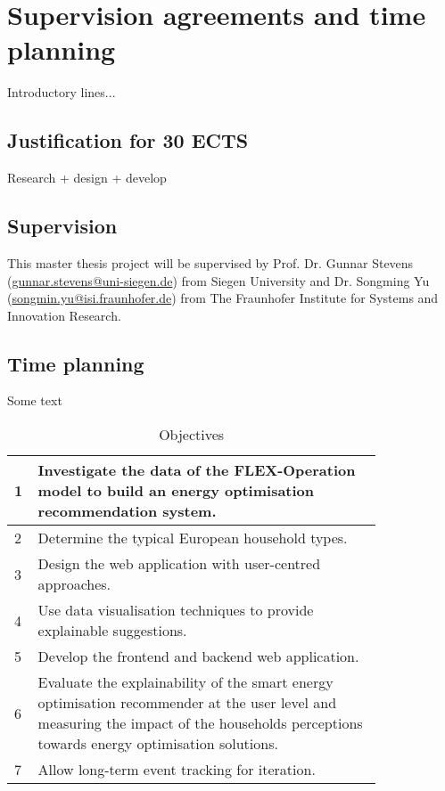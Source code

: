 \chapter{Supervision agreements and time planning} 

Introductory lines...

\section{Justification for 30 ECTS}

Research + design + develop

\section{Supervision}

This master thesis project will be supervised by 
Prof. Dr. Gunnar Stevens (\href{mailto:gunnar.stevens@uni-siegen.de}{gunnar.stevens@uni-siegen.de}) from Siegen University and 
Dr. Songming Yu (\href{mailto:songmin.yu@isi.fraunhofer.de}{songmin.yu@isi.fraunhofer.de}) from The Fraunhofer Institute for Systems and Innovation Research. 

\section{Time planning}

Some text \\

\begin{table}[h]
    \begin{center}
        \begin{tabular}{ p{0.02\linewidth} p{0.8\linewidth} }
        \hline 
        \cellcolor{yellow!70!lime}1 & Investigate the data of the FLEX-Operation model to build an energy optimisation recommendation system. \\
        \hline 
        \cellcolor{yellow!60!lime}2 & Determine the typical European household types. \\
        \hline 
        \cellcolor{yellow!50!lime}3 & Design the web application with user-centred approaches. \\
        \hline 
        \cellcolor{yellow!40!lime}4 & Use data visualisation techniques to provide explainable suggestions. \\
        \hline 
        \cellcolor{yellow!30!lime}5 & Develop the frontend and backend web application. \\
        \hline 
        \cellcolor{yellow!20!lime}6 & Evaluate the explainability of the smart energy optimisation recommender at the user level and measuring the impact of the households perceptions towards energy optimisation solutions. \\
        \hline
        \cellcolor{yellow!10!lime}7 & Allow long-term event tracking for iteration. \\
        \hline 
        \end{tabular}
        \caption{Objectives}
        \label{tab:objectives}
    \end{center}
\end{table}

